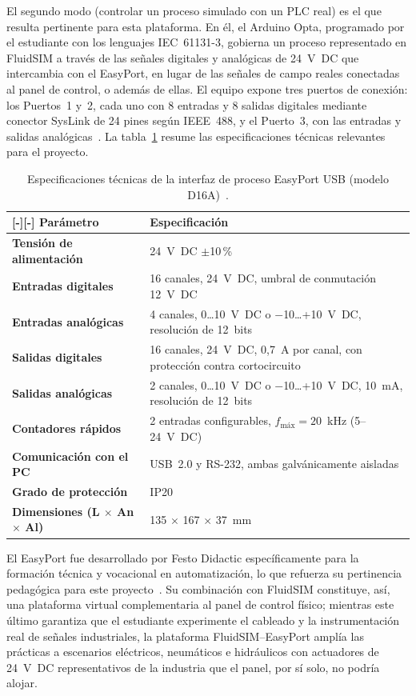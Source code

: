 \documentclass[12pt,a4paper,oneside]{report}
\newcommand{\filacolor}[1]{\rowcolor{#1}[\dimexpr\tabcolsep-\arrayrulewidth\relax][\dimexpr\tabcolsep-\arrayrulewidth\relax]}
\begin{document}
El segundo modo (controlar un proceso simulado con un PLC real) es el que resulta pertinente para esta plataforma. En él, el Arduino Opta, programado por el estudiante con los lenguajes IEC~61131-3, gobierna un proceso representado en FluidSIM a través de las señales digitales y analógicas de 24~V~DC que intercambia con el EasyPort, en lugar de las señales de campo reales conectadas al panel de control, o además de ellas. El equipo expone tres puertos de conexión: los Puertos~1 y~2, cada uno con 8 entradas y 8 salidas digitales mediante conector SysLink de 24 pines según IEEE~488, y el Puerto~3, con las entradas y salidas analógicas~\cite{ref27}. La tabla~\ref{tab:easyport} resume las especificaciones técnicas relevantes para el proyecto.

\begin{table}[H]
\centering
\caption{Especificaciones técnicas de la interfaz de proceso EasyPort USB (modelo D16A)~\cite{ref27}.}
\label{tab:easyport}
\renewcommand{\arraystretch}{1.3}
\begin{tabularx}{\textwidth}{|>{\bfseries}p{4.5cm}|X|}
\hline
\filacolor{TableGray}
\textbf{Parámetro} & \textbf{Especificación} \\
\hline
Tensión de alimentación & 24~V~DC $\pm$10\,\% \\
\hline
Entradas digitales & 16 canales, 24~V~DC, umbral de conmutación 12~V~DC \\
\hline
Entradas analógicas & 4 canales, 0\ldots10~V~DC o $-$10\ldots+10~V~DC, resolución de 12~bits \\
\hline
Salidas digitales & 16 canales, 24~V~DC, 0,7~A por canal, con protección contra cortocircuito \\
\hline
Salidas analógicas & 2 canales, 0\ldots10~V~DC o $-$10\ldots+10~V~DC, 10~mA, resolución de 12~bits \\
\hline
Contadores rápidos & 2 entradas configurables, $f_{\textrm{máx}}=20$~kHz (5--24~V~DC) \\
\hline
Comunicación con el PC & USB~2.0 y RS-232, ambas galvánicamente aisladas \\
\hline
Grado de protección & IP20 \\
\hline
Dimensiones (L $\times$ An $\times$ Al) & 135 $\times$ 167 $\times$ 37~mm \\
\hline
\end{tabularx}
\end{table}

El EasyPort fue desarrollado por Festo Didactic específicamente para la formación técnica y vocacional en automatización, lo que refuerza su pertinencia pedagógica para este proyecto~\cite{ref27}. Su combinación con FluidSIM constituye, así, una plataforma virtual complementaria al panel de control físico; mientras este último garantiza que el estudiante experimente el cableado y la instrumentación real de señales industriales, la plataforma FluidSIM--EasyPort amplía las prácticas a escenarios eléctricos, neumáticos e hidráulicos con actuadores de 24~V~DC representativos de la industria que el panel, por sí solo, no podría alojar.
\end{document}
